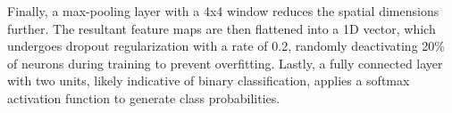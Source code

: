 		Finally, a max-pooling layer with a 4x4 window reduces the spatial dimensions further. The resultant feature maps are then flattened into a 1D vector, which undergoes dropout regularization with a rate of 0.2, randomly deactivating 20\% of neurons during training to prevent overfitting. Lastly, a fully connected layer with two units, likely indicative of binary classification, applies a softmax activation function to generate class probabilities.
	\newpage
	\begin{figure}[hbt!]
	\end{figure}


